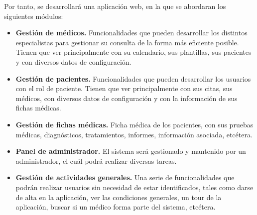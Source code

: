 		Por tanto, se desarrollará una aplicación web, en la que se abordaran los siguientes módulos:
	\begin{itemize}
		\item \textbf{Gestión de médicos.} Funcionalidades que pueden desarrollar los distintos especialistas para gestionar su consulta de la forma más eficiente posible. Tienen que ver principalmente con su calendario, sus plantillas, sus pacientes y con diversos datos de configuración.
		\item \textbf{Gestión de pacientes.} Funcionalidades que pueden desarrollar los usuarios con el rol de paciente. Tienen que ver principalmente con sus citas, sus médicos, con diversos datos de configuración y con la información de sus fichas médicas.
		\item \textbf{Gestión de fichas médicas.} Ficha médica de los pacientes, con sus pruebas médicas, diagnósticos, tratamientos, informes, información asociada, etcétera.
		\item \textbf{Panel de administrador.} El sistema será gestionado y mantenido por un administrador, el cuál podrá realizar diversas tareas.
		\item \textbf{Gestión de actividades generales.} Una serie de funcionalidades que podrán realizar usuarios sin necesidad de estar identificados, tales como darse de alta en la aplicación, ver las condiciones generales, un tour de la aplicación, buscar si un médico forma parte del sistema, etcétera.
	\end{itemize}
	 
